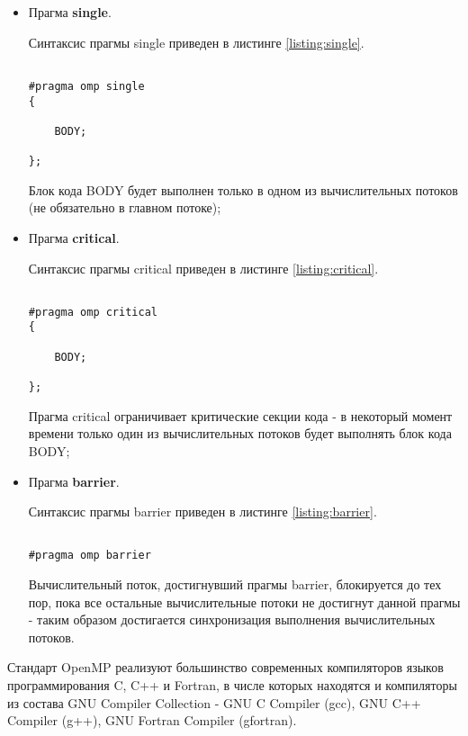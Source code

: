 \begin{itemize}

	\item Прагма {\bf single}.

	Синтаксис прагмы single приведен в листинге \ref{listing:single}.

\begin{lstlisting}

#pragma omp single
{

	BODY;

};

\end{lstlisting}
\mylistingend

	Блок кода BODY будет выполнен только в одном из вычислительных потоков (не обязательно в главном потоке);

	\item Прагма {\bf critical}.

	Синтаксис прагмы critical приведен в листинге \ref{listing:critical}.

\begin{lstlisting}

#pragma omp critical
{

	BODY;

};

\end{lstlisting}
\mylistingend

	Прагма critical ограничивает критические секции кода - в некоторый момент времени только один из вычислительных потоков будет выполнять блок кода BODY;

	\item Прагма {\bf barrier}.

	Синтаксис прагмы barrier приведен в листинге \ref{listing:barrier}.

\begin{lstlisting}

#pragma omp barrier

\end{lstlisting}
\mylistingend

	Вычислительный поток, достигнувший прагмы barrier, блокируется до тех пор, пока все остальные вычислительные потоки не достигнут данной прагмы - таким образом достигается синхронизация выполнения вычислительных потоков.

\end{itemize}

Стандарт OpenMP реализуют большинство современных компиляторов языков программирования C, C++ и Fortran, в числе которых находятся и компиляторы из состава GNU Compiler Collection - GNU C Compiler (gcc), GNU C++ Compiler (g++), GNU Fortran Compiler (gfortran).

